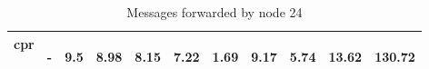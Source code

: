 \documentclass{article}
\begin{document}
\begin{table}[H]
\begin{center}
\begin{tabular}{|c|c|c|c|c|c|c|c|c|c|c|}
				    cpr & \begin{footnotesize}-\end{footnotesize} & \begin{footnotesize}9.5\end{footnotesize} & \begin{footnotesize}8.98\end{footnotesize} & \begin{footnotesize}8.15\end{footnotesize} & \begin{footnotesize}7.22\end{footnotesize} & \begin{footnotesize}1.69\end{footnotesize} & \begin{footnotesize}9.17\end{footnotesize} & \begin{footnotesize}5.74\end{footnotesize} & \begin{footnotesize}13.62\end{footnotesize} & \begin{footnotesize}130.72\end{footnotesize}\\ \hline
			    \end{tabular}
			\end{center}	
			\caption{Messages forwarded by node 24}
			\label{tab:25F24}
		\end{table}
		
\end{document}
